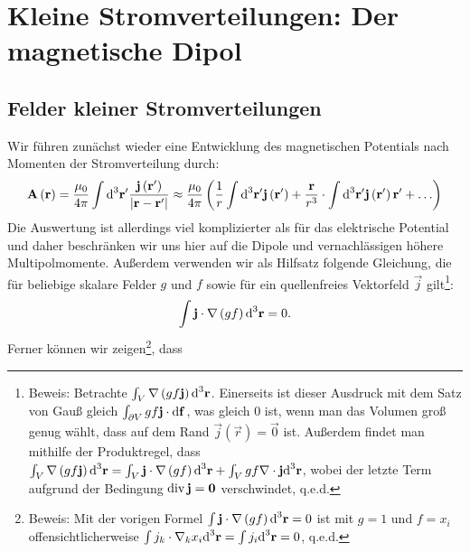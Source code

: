 \section{Kleine Stromverteilungen: Der magnetische Dipol\label{mark-5.4}}

\subsection{Felder kleiner Stromverteilungen\label{mark-5.4.1}}

Wir führen zunächst wieder eine Entwicklung des magnetischen Potentials nach Momenten der Stromverteilung durch:
\begin{equation}
    \label{eq:entwicklung_magn_potential}
	\mathbf{A}\left(\mathbf{r}\right)=\frac{\mu _{0}}{4\pi }\int \text{d} ^{3}\mathbf{r}'\frac{\mathbf{j}\left(\mathbf{r}'\right)}{\left| \mathbf{r}-\mathbf{r}'\right| }\approx \frac{\mu _{0}}{4\pi }\left(\frac{1}{r}\int \text{d} ^{3}\mathbf{r}'\mathbf{j}\left(\mathbf{r}'\right)+\frac{\mathbf{r}}{r^{3}}\cdot \int \text{d} ^{3}\mathbf{r}'\mathbf{j}\left(\mathbf{r}'\right)\mathbf{r}'+\ldots \right)
\end{equation}
Die Auswertung ist allerdings viel komplizierter als für das elektrische Potential und daher beschränken wir uns hier auf die Dipole und vernachlässigen höhere Multipolmomente. Außerdem verwenden wir als Hilfsatz folgende Gleichung, die für beliebige skalare Felder $g$ und $f$ sowie für ein quellenfreies Vektorfeld $\vec {j}$ gilt\footnote{Beweis: Betrachte $\int _{V}\nabla \left(gf\mathbf{j}\right)\text{d} ^{3}\mathbf{r}$. Einerseits ist dieser Ausdruck mit dem Satz von Gauß gleich $\int _{\partial V}gf\mathbf{j}\cdot \text{d} \mathbf{f}$, was gleich $0$ ist, wenn man das Volumen groß genug wählt, dass auf dem Rand $\vec {j}\left(\vec {r}\right)=\vec {0}$ ist. Außerdem findet man mithilfe der Produktregel, dass $\int _{V}\nabla \left(gf\mathbf{j}\right)\text{d} ^{3}\mathbf{r}=\int _{V}\mathbf{j}\cdot \nabla \left(gf\right)\text{d} ^{3}\mathbf{r}+\int _{V}gf\nabla \cdot \mathbf{j}\text{d} ^{3}\mathbf{r}$, wobei der letzte Term aufgrund der Bedingung $\operatorname{div} \mathbf{j}=\mathbf{0}$ verschwindet, q.e.d.}:
\begin{equation}
    \label{eq:hilfssatz}
	\int \mathbf{j}\cdot \nabla \left(gf\right)\text{d} ^{3}\mathbf{r}=0.
\end{equation}
Ferner können wir zeigen\footnote{Beweis: Mit der vorigen Formel $\int \mathbf{j}\cdot \nabla \left(gf\right)\text{d} ^{3}\mathbf{r}=0$ ist mit $g=1$ und $f=x_{i}$ offensichtlicherweise $\int j_{k}\cdot \nabla _{k}x_{i}\text{d} ^{3}\mathbf{r}=\int j_{i}\text{d} ^{3}\mathbf{r}=0$, q.e.d. }, dass
